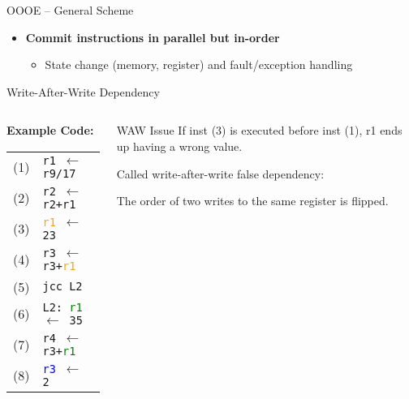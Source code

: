 \documentclass[aspectratio=169,12pt]{beamer}
\begin{document}
\begin{frame}{OOOE -- General Scheme}
\begin{itemize}
    \item \textbf{Commit instructions in parallel but in-order}
    \begin{itemize}
      \item State change (memory, register) and fault/exception handling
    \end{itemize}
  \end{itemize}
\end{frame}

\begin{frame}{Write-After-Write Dependency}
  \begin{columns}
    \begin{column}{0.5\textwidth}
      \textbf{Example Code:}
      \begin{tabular}{ll}
        (1) & \texttt{\textcolor{r1color}{r1} $\leftarrow$ r9/17} \\
        (2) & \texttt{\textcolor{r2color}{r2} $\leftarrow$ \textcolor{r2color}{r2}+\textcolor{r1color}{r1}} \\
        (3) & \texttt{\textcolor{orange}{r1} $\leftarrow$ 23} \\
        (4) & \texttt{\textcolor{r3color}{r3} $\leftarrow$ \textcolor{r3color}{r3}+\textcolor{orange}{r1}} \\
        (5) & \texttt{jcc L2} \\
        (6) & \texttt{L2: \textcolor{green}{r1} $\leftarrow$ 35} \\
        (7) & \texttt{\textcolor{r4color}{r4} $\leftarrow$ \textcolor{r3color}{r3}+\textcolor{green}{r1}} \\
        (8) & \texttt{\textcolor{blue}{r3} $\leftarrow$ 2} \\
      \end{tabular}
    \end{column}
    
    \begin{column}{0.5\textwidth}
      \begin{block}{WAW Issue}
        If inst (3) is executed before inst (1), r1 ends up having a wrong value.
        
        \vspace{0.3cm}
        
        Called \alert{write-after-write false dependency}:
        
        The order of two writes to the same register is flipped.
      \end{block}
    \end{column}
  \end{columns}
\end{frame}
\end{document}
